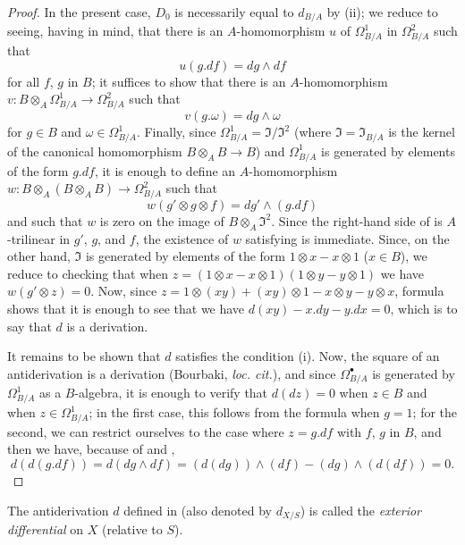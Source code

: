 \begin{proof}
In the present case, $D_0$ is necessarily equal to $d_{B/A}$ by \rm{(ii)};
we reduce to seeing, having  in mind, that there is an $A$-homomorphism $u$ of $\Omega_{B/A}^1$ in $\Omega_{B/A}^2$ such that 
\[
  \label{IV.16.6.2.3}
  u(g.df) = dg \wedge df
  \tag{16.6.2.3}
\]
for all $f$, $g$ in $B$;
it suffices to show that there is an $A$-homomorphism $v:B \otimes_A \Omega_{B/A}^1 \to \Omega_{B/A}^2$ such that
\[
  \label{IV.16.6.2.4}
  v(g.\omega) = dg \wedge \omega
  \tag{16.6.2.4}
\]
for $g \in B$ and $\omega \in \Omega_{B/A}^1$.
Finally, since $\Omega_{B/A}^1 = \mathfrak{I}/\mathfrak{I}^2$ (where $\mathfrak{I} = \mathfrak{I}_{B/A}$ is the kernel of the canonical homomorphism $B \otimes_A B \to B$) and $\Omega_{B/A}^1$ is generated by elements of the form $g.df$, it is enough to define an $A$-homomorphism $w: B \otimes_A (B \otimes_A B) \to \Omega_{B/A}^2$ such that
\[
  \label{IV.16.6.2.5}
  w(g' \otimes g \otimes f) = dg' \wedge (g.df)
  \tag{16.6.2.5}
\]
and such that $w$ is zero on the image of $B \otimes_A \mathfrak{I}^2$.
Since the right-hand side of  is $A$-trilinear in $g'$, $g$, and $f$, the existence of $w$ satisfying  is immediate.
Since, on the other hand, $\mathfrak{I}$ is generated by elements of the form $1 \otimes x - x \otimes 1$ ($x \in B$), we reduce to checking that when $z = (1 \otimes x - x \otimes 1)(1 \otimes y - y \otimes 1)$ we have $w(g'\otimes z) = 0$. 
Now, since $z = 1 \otimes (xy) + (xy) \otimes 1 - x \otimes y - y \otimes x$, formula  shows that it is 
enough to see that we have $d(xy) - x.dy - y.dx = 0$, which is to say that $d$ is a derivation.

It remains to be shown that $d$ satisfies the condition \rm{(i)}.
Now, the square of an antiderivation is a derivation (Bourbaki, \emph{loc. cit.}), and since $\Omega_{B/A}^\bullet$ is generated by $\Omega_{B/A}^1$ as a $B$-algebra, it is enough to verify that $d(dz) = 0$ when $z \in B$ and when $z \in \Omega_{B/A}^1$;
in the first case, this follows from the formula  when $g = 1$;
for the second, we can restrict ourselves to the case where $z = g.df$ with $f$, $g$ in $B$, and then we have, because of  and , 
\[
  d(d(g.df)) = d(dg \wedge df) = (d(dg)) \wedge (df) - (dg) \wedge (d(df)) = 0.
\] 
\end{proof}

\begin{definition}[16.6.3]
\label{IV.16.6.3}
The antiderivation $d$ defined in  (also denoted by $d_{X/S}$) is called the \emph{exterior differential} on $X$ (relative to $S$). 
\end{definition}

